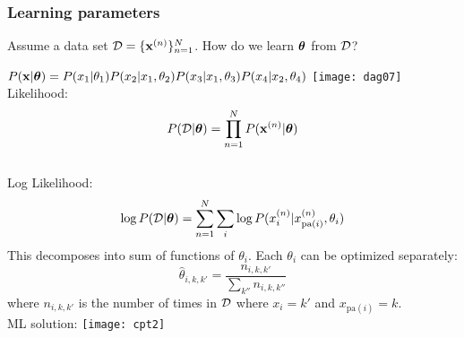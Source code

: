 \begin{frame}
\frametitle{Learning parameters}

Assume a data set $\mathcal{D} = \{ \mathbf x^{(n)} \}_{n=1}^N$. How do we learn
$\boldsymbol{\theta}$ from $\mathcal{D}$? 

\vspace*{-7.5ex}

\hspace{3ex} $P(\mathbf x|\boldsymbol{\theta}) = P(x_1|\theta_1) P(x_2|x_1,\theta_2)
P(x_3|x_1,\theta_3) P(x_4|x_2,\theta_4) $ \hspace{8ex} \texttt{[image: dag07]}\\[1ex]


Likelihood:
\vspace*{-2ex}
\[
P(\mathcal{D}|\boldsymbol{\theta}) = \prod_{n=1}^N P(\mathbf x^{(n)}|\boldsymbol{\theta}) 
\] \\[-2ex]
Log Likelihood:
\vspace*{-2ex}
\[
\log P(\mathcal{D}|\boldsymbol{\theta}) = \sum_{n=1}^N \sum_i \log P(x_i^{(n)}|x_{\mathrm{pa}(i)}^{(n)}, \theta_i)
\]
This decomposes into sum of functions of $\theta_i$. Each $\theta_i$ can be
optimized separately:
\vspace*{-2ex}
\[
\hat{\theta}_{i,k,k'} = \frac{n_{i,k,k'}}{\sum_{k''} n_{i,k,k''}}
\] 
\vspace*{-.5ex}
where $n_{i,k,k'}$ is the number of times in $\mathcal{D}$ where $x_i=k'$ and
$x_{\mathrm{pa}(i)} = k$. \\[1ex]

ML  solution: 
\hfill \texttt{[image: cpt2]} 
\end{frame}

